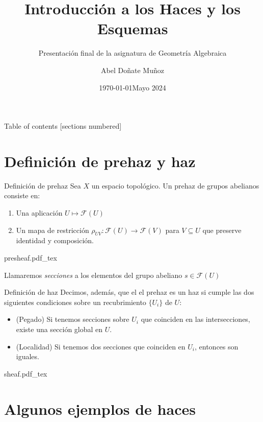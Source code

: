 \documentclass[10pt]{beamer}
\title{Introducción a los Haces y los Esquemas}
\subtitle{Presentación final de la asignatura de Geometría Algebraica}
\date{\today}
\author{Abel Doñate Muñoz}
\institute{Universitat Politècnica de Catalunya}
\date{Mayo 2024}
\newcommand{\incfig}[1]{%
\center
\def\svgwidth{0.9\columnwidth}
{#1.pdf_tex}
}
\begin{document}
\maketitle

\begin{frame}{Table of contents}
  [sections numbered]
  \tableofcontents%
\end{frame}

\section{Definición de prehaz y haz}

\begin{frame}[fragile]{Definición de prehaz}
Sea $X$ un espacio topológico. Un prehaz de grupos abelianos consiste en:
\begin{enumerate}
  \item Una aplicación $U \mapsto \mathcal{F}(U)$
  \item Un mapa de restricción $\rho_{UV}: \mathcal{F}(U) \to \mathcal{F}(V)$ para $ V \subseteq U$ que preserve identidad y composición.
\end{enumerate} 

\incfig{presheaf}

Llamaremos \textit{secciones} a los elementos del grupo abeliano $s \in \mathcal{F}(U) $ 

\end{frame}


\begin{frame}[fragile]{Definición de haz}
Decimos, además, que el el prehaz es un haz si cumple las dos siguientes condiciones sobre un recubrimiento $\{U_i\}$ de $U$:
\begin{itemize}
  \item (Pegado) Si tenemos secciones sobre $U_i$ que coinciden en las intersecciones, existe una sección global en $U$.
  \item (Localidad) Si tenemos dos secciones que coinciden en $U_i$, entonces son iguales.
\end{itemize}

\incfig{sheaf}

\end{frame}

\section{Algunos ejemplos de haces}
\end{document}
